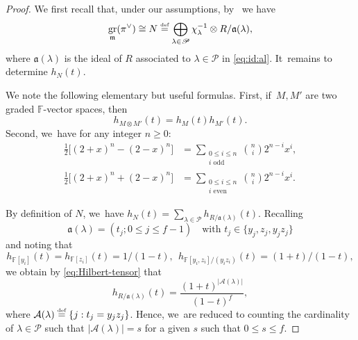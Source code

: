 \documentclass[JEP,XML,SOM,Unicode,NoFloatCountersInSection, NoEqCountersInSection,published]{cedram}
\newcommand{\defeq}{\stackrel{\textrm{\tiny{\upshape{def}}}}{=}}
\newcommand{\F}{\mathbb{F}}
\renewcommand{\P}{\mathscr P}
\newcommand{\fa}{\mathfrak{a}}
\DeclareMathOperator{\gr}{gr}
\theoremstyle{plain}
\theoremstyle{definition}
\begin{document}
\begin{proof}
{We first recall that, under our assumptions, by~\cite[Th.\,2.1.2]{BHHMS4} we have
\[
\gr_{\m}(\pi^{\vee}) \cong N \defeq \bigoplus_{\lambda\in\P}\chi_{\lambda}^{-1}\otimes R/\fa(\lambda),
\]
where $\mathfrak{a}(\lambda)$ is the ideal of $R$ associated to $\lambda\in\P$ in \eqref{eq:id:al}. It~remains to determine $h_N(t)$.}

We note the following elementary but useful formulas.
First, if~$M, M'$ are two graded $\F$-vector spaces, then
\begin{equation}\label{eq:Hilbert-tensor}h_{M\otimes M'}(t)=h_M(t)h_{M'}(t).
\end{equation}
Second, we~have for any integer $n\geq 0$:
\begin{align}
\label{eq:binom1}\frac{1}{2}\Big[(2+x)^n-(2-x)^n\Big]&=\sum_{\substack{0\leq i\leq n\\ i \text{ odd}}}\binom{n}{i} 2^{n-i}x^i,\\
\label{eq:binom2}\frac{1}{2}\Big[(2+x)^n+(2-x)^n\Big]&=\sum_{\substack{0\leq i\leq n\\ i \text{ even}}}\binom{n}{i}2^{n-i}x^i.
\end{align}

By definition of $N$, we~have $h_{N}(t)=\sum_{\lambda\in\P} h_{R/\mathfrak{a}(\lambda)}(t)$. Recalling
\[
\mathfrak{a}(\lambda)=(t_j; 0\leq j\leq f-1)\quad\text{with }t_j\in\{y_j,z_j,y_jz_j\}
\]
and noting that
\[
h_{\F[y_i]}(t)=h_{\F[z_i]}(t)=1/(1-t),\ \ h_{\F[y_i,z_i]/(y_iz_i)}(t)=(1+t)/(1-t),
\]
we obtain by \eqref{eq:Hilbert-tensor} that
\[
h_{R/\mathfrak{a}(\lambda)}(t)=\frac{(1+t)^{|\mathcal{A}(\lambda)|}}{(1-t)^f},
\]
where $\mathcal{A}(\lambda)\defeq \{j: t_j=y_jz_j\}$. Hence, we~are reduced to counting the cardinality of $\lambda\in \P$ such that $|\mathcal{A}(\lambda)|=s$ for a given $s$ such that $0\leq s\leq f$.


\end{proof}
\end{document}
